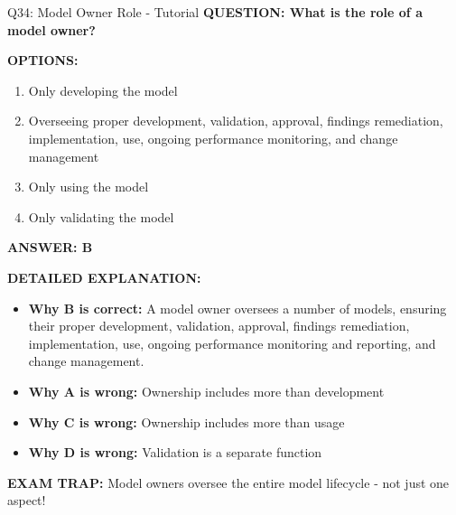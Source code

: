 \documentclass[8pt]{beamer}
\begin{document}
	\begin{frame}{Q34: Model Owner Role - Tutorial}
		\fontsize{6.5}{7.5}\selectfont
		\textbf{QUESTION: What is the role of a model owner?}
		
		\vspace{0.1cm}
		\textbf{OPTIONS:}
		\begin{enumerate}
			\item Only developing the model
			\item Overseeing proper development, validation, approval, findings remediation, implementation, use, ongoing performance monitoring, and change management
			\item Only using the model
			\item Only validating the model
		\end{enumerate}
		
		\vspace{0.1cm}
		\textcolor{myblue}{\textbf{ANSWER: B}}
		
		\vspace{0.1cm}
		\textbf{DETAILED EXPLANATION:}
		\begin{itemize}
			\item \textbf{Why B is correct:} A model owner oversees a number of models, ensuring their proper development, validation, approval, findings remediation, implementation, use, ongoing performance monitoring and reporting, and change management.
			\item \textbf{Why A is wrong:} Ownership includes more than development
			\item \textbf{Why C is wrong:} Ownership includes more than usage
			\item \textbf{Why D is wrong:} Validation is a separate function
		\end{itemize}
		
		\textcolor{myred}{\textbf{EXAM TRAP:}} Model owners oversee \textcolor{myblue}{the entire model lifecycle} - not just one aspect!
	\end{frame}
	
\end{document}
